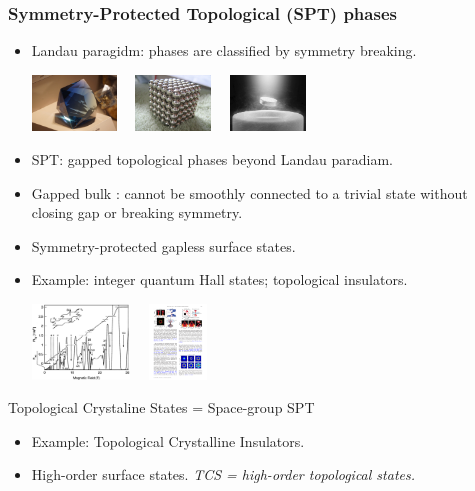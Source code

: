 \documentclass[xcolor=table, 11pt, aspectratio=169]{beamer}
\begin{document}
\begin{frame}
  \frametitle{Symmetry-Protected Topological (SPT) phases}
  \begin{itemize}
  \item Landau paragidm: phases are classified by symmetry breaking.
    \begin{center}
      \includegraphics[height=1.5cm]{../resources/crystal}~~
      \includegraphics[height=1.5cm]{../resources/magnet}~~
      \includegraphics[height=1.5cm]{../resources/sc}
    \end{center}
  \item SPT: gapped topological phases beyond Landau paradiam.
  \item Gapped bulk : cannot be smoothly connected to a trivial state without closing gap or breaking symmetry.
  \item Symmetry-protected gapless surface states.
  \item Example: integer quantum Hall states; topological insulators.
    \begin{center}
      \includegraphics[height=2cm]{../resources/fqhe}~~
      \includegraphics[height=2cm]{../spspt/ti_surface}
    \end{center}
  \end{itemize}
\end{frame}

\begin{frame}{Topological Crystaline States = Space-group SPT}
  \begin{itemize}
    \item Example: Topological Crystalline Insulators.
    \item High-order surface states.
    \emph{TCS = high-order topological states.}
  \end{itemize}
  
\end{frame}
\end{document}
